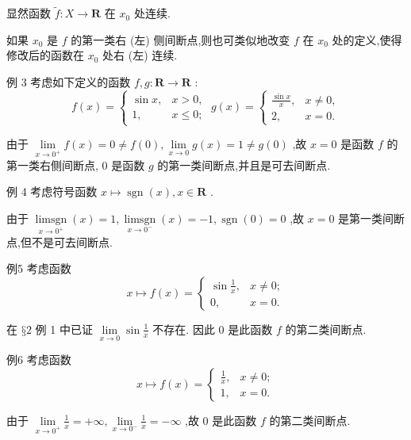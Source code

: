 显然函数 $\widetilde{f} : X \rightarrow  \mathbf{R}$ 在 ${x}_{0}$ 处连续.

如果 ${x}_{0}$ 是 $f$ 的第一类右 (左) 侧间断点,则也可类似地改变 $f$ 在 ${x}_{0}$ 处的定义,使得修改后的函数在 ${x}_{0}$ 处右 (左) 连续.

例 3 考虑如下定义的函数 $f,g : \mathbf{R} \rightarrow  \mathbf{R}$ :
$$f\left( x\right)  = \left\{  {\begin{array}{ll} \sin x, & x > 0, \\  1, & x \leq  0; \end{array}\;g\left( x\right)  = \left\{  \begin{array}{ll} \frac{\sin x}{x}, & x \neq  0, \\  2, & x = 0. \end{array}\right. }\right.$$

由于 $\mathop{\lim }\limits_{{x \rightarrow  {0}^{ + }}}f\left( x\right)  = 0 \neq  f\left( 0\right) ,\mathop{\lim }\limits_{{x \rightarrow  0}}g\left( x\right)  = 1 \neq  g\left( 0\right)$ ,故 $x = 0$ 是函数 $f$ 的第一类右侧间断点, 0 是函数 $g$ 的第一类间断点,并且是可去间断点.

例 4 考虑符号函数 $x \mapsto  \operatorname{sgn}\left( x\right) ,x \in  \mathbf{R}$ .

由于 $\mathop{\operatorname{limsgn}}\limits_{{x \rightarrow  {0}^{ + }}}\left( x\right)  = 1,\mathop{\operatorname{limsgn}}\limits_{{x \rightarrow  {0}^{ - }}}\left( x\right)  =  - 1,\operatorname{sgn}\left( 0\right)  = 0$ ,故 $x = 0$ 是第一类间断点,但不是可去间断点.

例5 考虑函数
$$x \mapsto  f\left( x\right)  = \left\{  \begin{array}{ll} \sin \frac{1}{x}, & x \neq  0; \\  0, & x = 0. \end{array}\right.$$

在 $§2$ 例 1 中已证 $\mathop{\lim }\limits_{{x \rightarrow  0}}\sin \frac{1}{x}$ 不存在. 因此 0 是此函数 $f$ 的第二类间断点.

例6 考虑函数
$$x \mapsto  f\left( x\right)  = \left\{  \begin{array}{ll} \frac{1}{x}, & x \neq  0; \\  1, & x = 0. \end{array}\right.$$

由于 $\mathop{\lim }\limits_{{x \rightarrow  {0}^{ + }}}\frac{1}{x} =  + \infty ,\mathop{\lim }\limits_{{x \rightarrow  {0}^{ - }}}\frac{1}{x} =  - \infty$ ,故 0 是此函数 $f$ 的第二类间断点.

